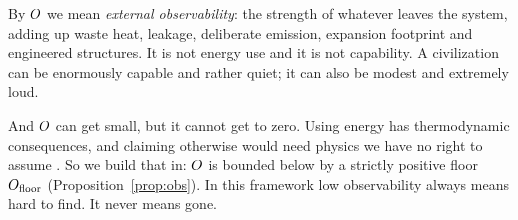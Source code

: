 By $O$ we mean \emph{external observability}: the strength of whatever leaves
the system, adding up waste heat, leakage, deliberate emission, expansion
footprint and engineered structures. It is not energy use and it is not
capability. A civilization can be enormously capable and rather quiet; it can
also be modest and extremely loud.

And $O$ can get small, but it cannot get to zero. Using energy has
thermodynamic consequences, and claiming otherwise would need physics we have no
right to assume \citep{dyson1960,kardashev1964}. So we build that in: $O$ is
bounded below by a strictly positive floor $O_{\mathrm{floor}}$
(Proposition~\ref{prop:obs}). In this framework low observability always means
hard to find. It never means gone. \Established
